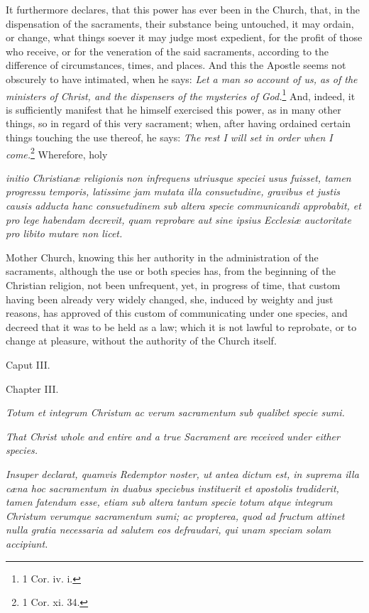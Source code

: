 It furthermore declares, that this power has ever been in the Church, that, in the dispensation of the sacraments, their substance being untouched, it may ordain, or change, what things soever it may judge most expedient, for the profit of those who receive, or for the veneration of the said sacraments, according to the difference of circumstances, times, and places. And this the Apostle seems not obscurely to have intimated, when he says: \emph{Let a man so account of us, as of the ministers of Christ, and the dispensers of the mysteries of God.}\footnote{\par   1 Cor. iv. i.} And, indeed, it is sufficiently manifest that he himself exercised this power, as in many other things, so in regard of this very sacrament; when, after having ordained certain things touching the use thereof, he says: \emph{The rest I will set in order when I come.}\footnote{\par   1 Cor. xi. 34.} Wherefore, holy

\emph{initio Christianæ religionis non infrequens utriusque speciei usus fuisset, tamen progressu temporis, latissime jam mutata illa consuetudine, gravibus et justis causis adducta hanc consuetudinem sub altera specie communicandi approbabit, et pro lege habendam decrevit, quam reprobare aut sine ipsius Ecclesiæ auctoritate pro libito mutare non licet.}

Mother Church, knowing this her authority in the administration of the sacraments, although the use or both species has, from the beginning of the Christian religion, not been unfrequent, yet, in progress of time, that custom having been already very widely changed, she, induced by weighty and just reasons, has approved of this custom of communicating under one species, and decreed that it was to be held as a law; which it is not lawful to reprobate, or to change at pleasure, without the authority of the Church itself.

Caput III.

Chapter III.

\emph{Totum et integrum Christum ac verum sacramentum sub qualibet specie sumi.}

\emph{That Christ whole and entire and a true Sacrament are received under either species.}

\emph{Insuper declarat, quamvis Redemptor noster, ut antea dictum est, in suprema illa cæna hoc sacramentum in duabus speciebus instituerit et apostolis tradiderit, tamen fatendum esse, etiam sub altera tantum specie totum atque integrum Christum verumque sacramentum sumi; ac propterea, quod ad fructum attinet nulla gratia necessaria ad salutem eos defraudari, qui unam speciam solam accipiunt.}

